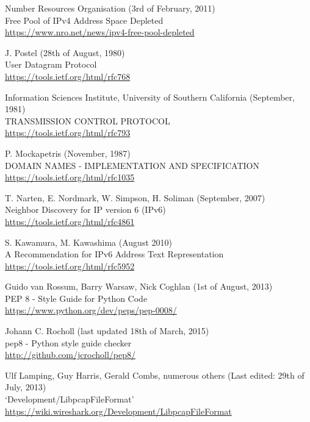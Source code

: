 \documentclass[10pt,a4paper,notitlepage]{report}
\begin{document}
\begin{thebibliography}{99}
	Number Resources Organisation (3rd of February, 2011)\\
	Free Pool of IPv4 Address Space Depleted\\
	\url{https://www.nro.net/news/ipv4-free-pool-depleted}

	J. Postel (28th of August, 1980)\\
	User Datagram Protocol\\
	\url{https://tools.ietf.org/html/rfc768}

	Information Sciences Institute, University of Southern California (September, 1981)\\
	TRANSMISSION CONTROL PROTOCOL\\
	\url{https://tools.ietf.org/html/rfc793}

	P. Mockapetris (November, 1987)\\
	DOMAIN NAMES - IMPLEMENTATION AND SPECIFICATION\\
	\url{https://tools.ietf.org/html/rfc1035}

	T. Narten, E. Nordmark, W. Simpson, H. Soliman (September, 2007)\\
	Neighbor Discovery for IP version 6 (IPv6)\\
	\url{https://tools.ietf.org/html/rfc4861}

	S. Kawamura, M. Kawashima (August 2010)\\
	A Recommendation for IPv6 Address Text Representation\\
	\url{https://tools.ietf.org/html/rfc5952}

	Guido van Rossum, Barry Warsaw, Nick Coghlan (1st of August, 2013)\\
	PEP 8 - Style Guide for Python Code\\
	\url{https://www.python.org/dev/peps/pep-0008/}
	
	Johann C. Rocholl (last updated 18th of March, 2015)\\
	pep8 - Python style guide checker\\
	\url{http://github.com/jcrocholl/pep8/}

	Ulf Lamping, Guy Harris, Gerald Combs, numerous others (Last edited: 29th of July, 2013)\\
	`Development/LibpcapFileFormat'\\
	\url{https://wiki.wireshark.org/Development/LibpcapFileFormat}

\end{thebibliography}
\end{document}

